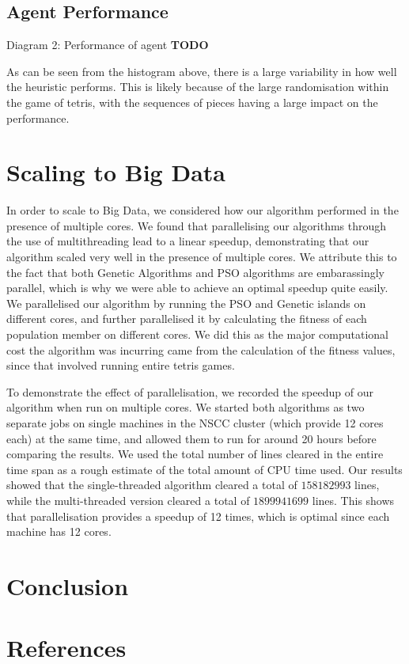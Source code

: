 \documentclass{article}
\begin{document}
	\subsection{Agent Performance}
	Diagram 2: Performance of agent
	\textbf{TODO}

	As can be seen from the histogram above, there is a large variability in how
	well the heuristic performs. This is likely because of the large randomisation
	within the game of tetris, with the sequences of pieces having a large impact
	on the performance.

    \section{Scaling to Big Data}
	In order to scale to Big Data, we considered how our algorithm performed in the presence
	of multiple cores. We found that parallelising our algorithms through the use
	of multithreading lead to a linear speedup, demonstrating that our algorithm scaled very
	well in the presence of multiple cores. We attribute this to the fact that
	both Genetic Algorithms and PSO algorithms are embarassingly parallel, which
	is why we were able to achieve an optimal speedup quite easily.\\

	We parallelised our algorithm by running the PSO and Genetic islands on different cores,
	and further parallelised it by calculating the fitness of each population member on different cores.
	We did this as the major computational cost the algorithm was incurring came from
	the calculation of the fitness values, since that involved running entire tetris games.

	To demonstrate the effect of parallelisation, we recorded the speedup of our algorithm when run
	on multiple cores. We started both algorithms as two separate jobs on single machines
	in the NSCC cluster (which provide 12 cores each) at the same time, and allowed them to run for around 20
	hours before comparing the results. We used the total number of lines cleared
	in the entire time span as a rough estimate of the total amount of
	CPU time used. Our results showed that the single-threaded algorithm cleared
	a total of $158182993$ lines, while the multi-threaded version cleared a total
	of $1899941699$ lines. This shows that parallelisation provides a speedup of 12 times,
	which is optimal since each machine has 12 cores.

    \section{Conclusion}


    \section{References}
\end{document}
